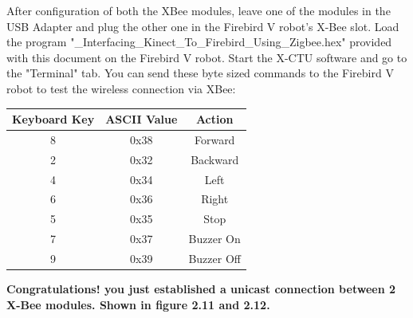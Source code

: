 \begin{flushleft}
After configuration of both the XBee modules, leave one of the modules in the USB Adapter and plug the other one in the Firebird V robot's X-Bee slot. Load the program "\_Interfacing\_Kinect\_To\_Firebird\_Using\_Zigbee.hex" provided with this document on the Firebird V robot. Start the X-CTU software and go to the "Terminal" tab.  You can send these byte sized commands to the Firebird V robot to test the wireless connection via XBee: 

\begin{tabular}{|c|c|c|}
\hline Keyboard Key & ASCII Value & Action \\ 
\hline 8 &  0x38 & Forward \\ 
\hline 2 &  0x32 & Backward \\ 
\hline 4 &  0x34 & Left \\ 
\hline 6 &  0x36 & Right \\ 
\hline 5 &  0x35 & Stop \\ 
\hline 7 &  0x37 & Buzzer On \\ 
\hline 9 &  0x39 & Buzzer Off \\ 
\hline 
\end{tabular}
\bigskip

\textbf{\Large{Congratulations!  you just established a unicast connection between 2 X-Bee modules. Shown in figure 2.11 and 2.12.}}


\end{flushleft}

